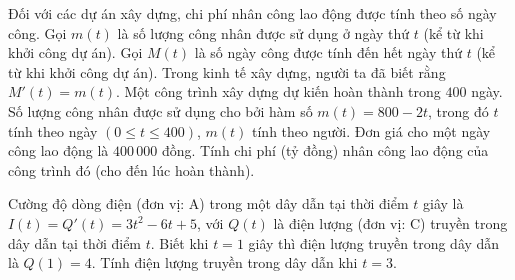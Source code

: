 \begin{bt}%
	Đối với các dự án xây dựng, chi phí nhân công lao động được tính theo số ngày công. Gọi $m(t)$ là số lượng công nhân được sử dụng ở ngày thứ $t$ (kể từ khi khởi công dự án). Gọi $M(t)$ là số ngày công được tính đến hết ngày thứ $t$ (kể từ khi khởi công dự án). Trong kinh tế xây dựng, người ta đã biết rằng $M'(t)=m(t)$. Một công trình xây dựng dự kiến hoàn thành trong $400$ ngày. Số lượng công nhân được sử dụng cho bởi hàm số $m(t)=800-2t$, trong đó $t$ tính theo ngày $\left( 0\le t\le 400 \right)$, $m(t)$ tính theo người. Đơn giá cho  một ngày công lao động là $400\,000$ đồng. Tính chi phí (tỷ đồng) nhân công lao động của công trình đó (cho đến lúc hoàn thành).
\end{bt}

\begin{bt}%
	Cường độ dòng điện (đơn vị: A) trong một dây dẫn tại thời điểm $t$ giây là  $I(t) = Q'(t) = 3t^2 - 6t + 5$, với $Q(t)$ là điện lượng (đơn vị: C) truyền trong dây dẫn tại thời điểm $t$. Biết khi $t = 1$ giây thì điện lượng truyền trong dây dẫn là $Q(1) = 4$. Tính điện lượng truyền trong dây dẫn khi $t = 3$.
\end{bt}

